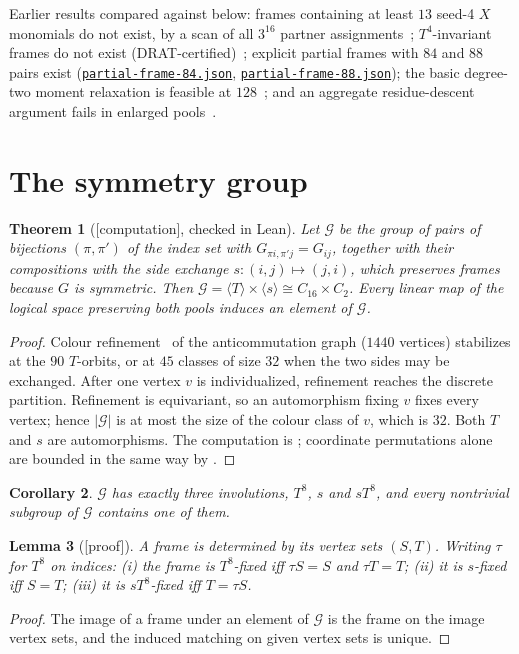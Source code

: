 \documentclass[11pt]{article}
\newtheorem{theorem}{Theorem}
\newtheorem{lemma}[theorem]{Lemma}
\newtheorem{corollary}[theorem]{Corollary}
\theoremstyle{definition}
\theoremstyle{remark}
\newcommand{\evidence}[1]{\textsf{[#1]}}
\newcommand{\repourl}{https://github.com/alectionary/vibe-math}
\newcommand{\cdir}{formalization/canonical-width/c16}
\newcommand{\rdir}{formalization/canonical-width/c16/restricted-frames-20261031}
\newcommand{\prior}[2]{\href{\repourl/blob/master/\cdir/#1}{#2}}
\newcommand{\ours}[2]{\href{\repourl/blob/master/\rdir/#1}{#2}}
\newcommand{\oursf}[1]{\ours{#1}{\texttt{\detokenize{#1}}}}
\begin{document}
Earlier results compared against below: frames containing at least $13$ seed-4 $X$ monomials do not exist, by a scan of all $3^{16}$ partner assignments~\cite{investigation}; $T^4$-invariant frames do not exist (DRAT-certified)~\cite{structural}; explicit partial frames with $84$ and $88$ pairs exist (\prior{partial-frame-84.json}{\texttt{partial-frame-84.json}}, \prior{partial-frame-88.json}{\texttt{partial-frame-88.json}}); the basic degree-two moment relaxation is feasible at $128$~\cite{structural}; and an aggregate residue-descent argument fails in enlarged pools~\cite{inverse4h}.

\section{The symmetry group}\label{sec:aut}

\begin{theorem}[\evidence{computation}, checked in Lean]\label{thm:aut}
Let $\mathcal G$ be the group of pairs of bijections $(\pi,\pi')$ of the index set with $G_{\pi i,\pi' j}=G_{ij}$, together with their compositions with the side exchange $s:(i,j)\mapsto(j,i)$, which preserves frames because $G$ is symmetric. Then $\mathcal G=\langle T\rangle\times\langle s\rangle\cong C_{16}\times C_2$. Every linear map of the logical space preserving both pools induces an element of $\mathcal G$.
\end{theorem}
\begin{proof}
Colour refinement~\cite{mckay} of the anticommutation graph ($1440$ vertices) stabilizes at the $90$ $T$-orbits, or at $45$ classes of size $32$ when the two sides may be exchanged. After one vertex $v$ is individualized, refinement reaches the discrete partition. Refinement is equivariant, so an automorphism fixing $v$ fixes every vertex; hence $|\mathcal G|$ is at most the size of the colour class of $v$, which is $32$. Both $T$ and $s$ are automorphisms. The computation is \oursf{explore/gram_wl.py}; coordinate permutations alone are bounded in the same way by \oursf{explore/auto_wl.py}.
\end{proof}

\begin{corollary}
$\mathcal G$ has exactly three involutions, $T^8$, $s$ and $sT^8$, and every nontrivial subgroup of $\mathcal G$ contains one of them.
\end{corollary}

\begin{lemma}[\evidence{proof}]\label{lem:classes}
A frame is determined by its vertex sets $(S,T)$. Writing $\tau$ for $T^8$ on indices: (i) the frame is $T^8$-fixed iff $\tau S=S$ and $\tau T=T$; (ii) it is $s$-fixed iff $S=T$; (iii) it is $sT^8$-fixed iff $T=\tau S$.
\end{lemma}
\begin{proof}
The image of a frame under an element of $\mathcal G$ is the frame on the image vertex sets, and the induced matching on given vertex sets is unique.
\end{proof}
\end{document}
